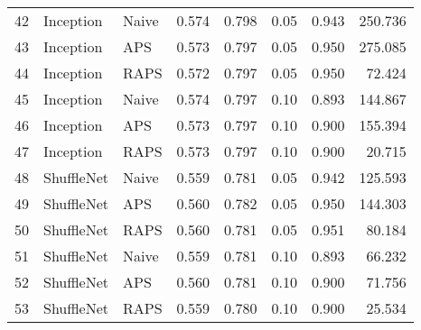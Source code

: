 \begin{tabular}{lllrrrrr}
42 &    Inception &     Naive &  0.574 &  0.798 &   0.05 &     0.943 &  250.736 \\
43 &    Inception &       APS &  0.573 &  0.797 &   0.05 &     0.950 &  275.085 \\
44 &    Inception &      RAPS &  0.572 &  0.797 &   0.05 &     0.950 &   72.424 \\
45 &    Inception &     Naive &  0.574 &  0.797 &   0.10 &     0.893 &  144.867 \\
46 &    Inception &       APS &  0.573 &  0.797 &   0.10 &     0.900 &  155.394 \\
47 &    Inception &      RAPS &  0.573 &  0.797 &   0.10 &     0.900 &   20.715 \\
48 &   ShuffleNet &     Naive &  0.559 &  0.781 &   0.05 &     0.942 &  125.593 \\
49 &   ShuffleNet &       APS &  0.560 &  0.782 &   0.05 &     0.950 &  144.303 \\
50 &   ShuffleNet &      RAPS &  0.560 &  0.781 &   0.05 &     0.951 &   80.184 \\
51 &   ShuffleNet &     Naive &  0.559 &  0.781 &   0.10 &     0.893 &   66.232 \\
52 &   ShuffleNet &       APS &  0.560 &  0.781 &   0.10 &     0.900 &   71.756 \\
53 &   ShuffleNet &      RAPS &  0.559 &  0.780 &   0.10 &     0.900 &   25.534 \\
\bottomrule
\end{tabular}
